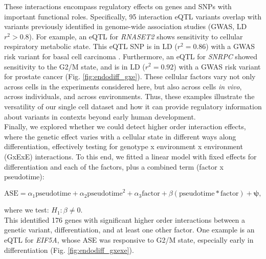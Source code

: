 These interactions encompass regulatory effects on genes and SNPs with important functional roles. Specifically, 95 interaction eQTL variants overlap with variants previously identified in genome-wide association studies (GWAS, LD $r^2>0.8$). 
For example, an eQTL for \textit{RNASET2} shows sensitivity to cellular respiratory metabolic state. 
This eQTL SNP is in LD ($r^2=0.86$) with a GWAS risk variant for basal cell carcinoma \cite{chahal2016genome}. Furthermore, an eQTL for \textit{SNRPC} showed sensitivity to the G2/M state, and is in LD ($r^2=0.92$) with a GWAS risk variant for prostate cancer \cite{schumacher2018association} (Fig. \ref{fig:endodiff_gxe}). 
These cellular factors vary not only across cells in the experiments considered here, but also across cells \textit{in vivo}, across individuals, and across environments. 
Thus, these examples illustrate the versatility of our single cell dataset and how it can provide regulatory information about variants in contexts beyond early human development.\\

Finally, we explored whether we could detect higher order interaction effects, where the genetic effect varies with a cellular state in different ways along differentiation, effectively testing for genotype x environment x environment (GxExE) interactions. 
To this end, we fitted a linear model with fixed effects for differentiation and each of the factors, plus a combined term (factor x pseudotime):

\begin{equation}\label{eq:endodiff_ase_gxexe}
    \mathrm{ASE} = \alpha_1 \mathrm{pseudotime} + \alpha_2 \mathrm{pseudotime}^2 + \alpha_3\mathrm{factor} + \beta (\mathrm{pseudotime}*\mathrm{factor}) + \boldsymbol{\psi},
\end{equation}

where we test: $H_1: \beta \neq 0$. \\

This identified 176 genes with significant higher order interactions between a genetic variant, differentiation, and at least one other factor. 
One example is an eQTL for \textit{EIF5A}, whose ASE was responsive to G2/M state, especially early in differentiation (Fig. \ref{fig:endodiff_gxexe}). 

